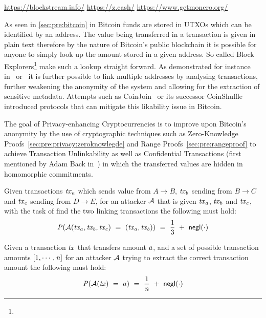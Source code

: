 \urldef\urlblockexp\url{https://blockstream.info/}
\urldef\urlzcash\url{https://z.cash/}
\urldef\urlmonero\url{https://www.getmonero.org/}

As seen in \cref{sec:pre:bitcoin} in Bitcoin funds are stored in UTXOs which can be identified by an address.
The value being transferred in a transaction is given in plain text therefore by the nature of Bitcoin's public blockchain it is possible for anyone to simply look up the amount stored in a given address.
So called Block Explorers\footnote{\urlblockexp} make such a lookup straight forward.
As demonstrated for instance in~\cite{barber2012bitter} or~\cite{reid2013analysis} it is further possible to link multiple addresses by analysing transactions, further weakening the anonymity of the system and allowing for the extraction of sensitive metadata.
Attempts such as CoinJoin~\cite{maxwell2013coinjoin} or its successor CoinShuffle~\cite{ruffing2014coinshuffle} introduced protocols that can mitigate this likability issue in Bitcoin.

The goal of Privacy-enhancing Cryptocurrencies is to improve upon Bitcoin's anonymity by the use of cryptographic techniques such as Zero-Knowledge Proofs~\cref{sec:pre:privacy:zeroknowlegde} and Range Proofs~\cref{sec:pre:rangeproof} to achieve Transaction Unlinkability as well as Confidential Transactions (first mentioned by Adam Back in~\cite{back2013confidentialtx}) in which the transferred values are hidden in homomorphic commitments.

\begin{definition} \label{def:pre:privacy:tx-unlink}
    Given transactions $\mathit{tx}_a$ which sends value from $A \rightarrow B$, $\mathit{tx}_b$ sending from $B \rightarrow C$ and $\mathit{tx}_c$ sending from $D \rightarrow E$, for an attacker $\mathcal{A}$ that is given $\mathit{tx}_a$, $\mathit{tx}_b$ and $\mathit{tx}_c$, with the task of find the two linking transactions the following must hold:
    \[ \mathit{P}(\mathcal{A}(\mathit{tx}_a, \mathit{tx}_b, \mathit{tx}_c) ~=~ (\mathit{tx}_a, \mathit{tx}_b)) ~=~ \frac{1}{3} ~+~ \mathsf{negl}(\cdot)\]
\end{definition}

\begin{definition} \label{def:pre:privacy:conf-tx}
    Given a transaction $\mathit{tx}$ that transfers amount $a$, and a set of possible transaction amounts $[1,\cdots,\mathit{n}]$ for an attacker $\mathcal{A}$ trying to extract the correct transaction amount the following must hold:
    \[ \mathit{P}(\mathcal{A}(\mathit{tx}) ~=~ a) ~=~ \frac{1}{\mathit{n}} ~+~ \mathsf{negl}(\cdot) \]
\end{definition}

